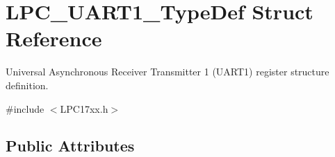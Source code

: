 \hypertarget{struct_l_p_c___u_a_r_t1___type_def}{\section{\-L\-P\-C\-\_\-\-U\-A\-R\-T1\-\_\-\-Type\-Def \-Struct \-Reference}
\label{struct_l_p_c___u_a_r_t1___type_def}
}


\-Universal \-Asynchronous \-Receiver \-Transmitter 1 (\-U\-A\-R\-T1) register structure definition.  




{\ttfamily \#include $<$\-L\-P\-C17xx.\-h$>$}

\subsection*{\-Public \-Attributes}
